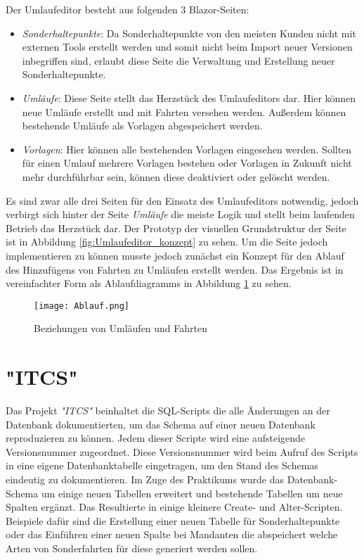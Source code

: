     Der Umlaufeditor besteht aus folgenden 3 Blazor-Seiten: 
    \begin{itemize}
        \item \emph{Sonderhaltepunkte}: Da Sonderhaltepunkte von den meisten Kunden nicht mit externen Tools erstellt werden und somit nicht beim Import neuer Versionen inbegriffen sind, 
                erlaubt diese Seite die Verwaltung und Erstellung neuer Sonderhaltepunkte.
        \item \emph{Umläufe}: Diese Seite stellt das Herzstück des Umlaufeditors dar. Hier können neue Umläufe erstellt und mit Fahrten versehen werden. Außerdem können bestehende Umläufe 
                als Vorlagen abgespeichert werden. 
        \item \emph{Vorlagen}: Hier können alle bestehenden Vorlagen eingesehen werden. Sollten für einen Umlauf mehrere Vorlagen bestehen oder Vorlagen in Zukunft nicht mehr durchführbar sein, können diese
                deaktiviert oder gelöscht werden.
    \end{itemize}

    Es sind zwar alle drei Seiten für den Einsatz des Umlaufeditors notwendig, jedoch verbirgt sich hinter der Seite \emph{Umläufe} die meiste Logik und stellt beim laufenden Betrieb das Herzstück dar.
    Der Prototyp der visuellen Grundstruktur der Seite ist in Abbildung \ref{fig:Umlaufeditor_konzept} zu sehen. Um die Seite jedoch implementieren zu können musste jedoch zunächst ein Konzept für den Ablauf 
    des Hinzufügens von Fahrten zu Umläufen erstellt werden. Das Ergebnis ist in vereinfachter Form als Ablaufdiagramms in Abbildung \ref{fig:Ablauf} zu sehen.

    \begin{figure}[H]
        \centering
        \texttt{[image: Ablauf.png]}
        \caption{Beziehungen von Umläufen und Fahrten}
        \label{fig:Ablauf}
    \end{figure}

     
\section{"ITCS"}\label{sec:itcs-design}
    Das Projekt \emph{"ITCS"} beinhaltet die SQL-Scripts die alle Änderungen an der Datenbank dokumentierten, um das Schema auf einer neuen Datenbank reproduzieren zu können. 
    Jedem dieser Scripte wird eine aufsteigende Versionsnummer zugeordnet. Diese Versionsnummer wird beim Aufruf des Scripts in eine eigene Datenbanktabelle eingetragen, um den Stand des Schemas
    eindeutig zu dokumentieren. Im Zuge des Praktikums wurde das Datenbank-Schema um einige neuen Tabellen erweitert und bestehende Tabellen um neue Spalten ergänzt. Das Resultierte in
    einige kleinere Create- und Alter-Scripten. Beispiele dafür sind die Erstellung einer neuen Tabelle für Sonderhaltepunkte oder das Einführen einer neuen Spalte bei Mandanten 
    die abspeichert welche Arten von Sonderfahrten für diese generiert werden sollen.

